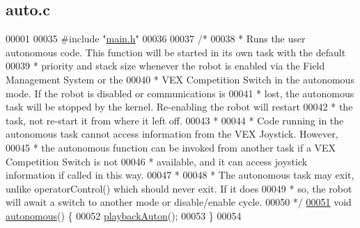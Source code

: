 \hypertarget{auto_8c_source}{}\subsection{auto.\+c}
\label{auto_8c_source}

\begin{DoxyCode}
00001 
00035 \textcolor{preprocessor}{#include "\hyperlink{main_8h}{main.h}"}
00036 
00037 \textcolor{comment}{/*}
00038 \textcolor{comment}{ * Runs the user autonomous code. This function will be started in its own task with the default}
00039 \textcolor{comment}{ * priority and stack size whenever the robot is enabled via the Field Management System or the}
00040 \textcolor{comment}{ * VEX Competition Switch in the autonomous mode. If the robot is disabled or communications is}
00041 \textcolor{comment}{ * lost, the autonomous task will be stopped by the kernel. Re-enabling the robot will restart}
00042 \textcolor{comment}{ * the task, not re-start it from where it left off.}
00043 \textcolor{comment}{ *}
00044 \textcolor{comment}{ * Code running in the autonomous task cannot access information from the VEX Joystick. However,}
00045 \textcolor{comment}{ * the autonomous function can be invoked from another task if a VEX Competition Switch is not}
00046 \textcolor{comment}{ * available, and it can access joystick information if called in this way.}
00047 \textcolor{comment}{ *}
00048 \textcolor{comment}{ * The autonomous task may exit, unlike operatorControl() which should never exit. If it does}
00049 \textcolor{comment}{ * so, the robot will await a switch to another mode or disable/enable cycle.}
00050 \textcolor{comment}{ */}
\hypertarget{auto_8c_source.tex_l00051}{}\hyperlink{main_8h_a3c7ca506bbc071fa740de13805b7f376}{00051} \textcolor{keywordtype}{void} \hyperlink{auto_8c_a3c7ca506bbc071fa740de13805b7f376}{autonomous}() \{
00052     \hyperlink{autonrecorder_8c_ae592a73a6bd9b2adcaa58a8ee82daaa0}{playbackAuton}();
00053 \}
00054 
\end{DoxyCode}
